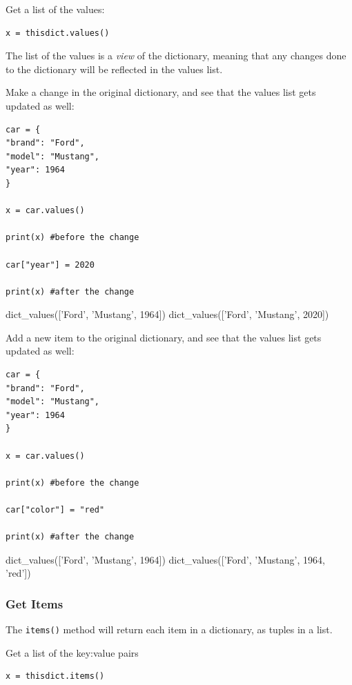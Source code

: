 \documentclass[12pt,a4paper]{article}
\newcommand{\code}[1]{%
	\colorbox{backcolour}{\lstinline{#1}}%
}
\begin{document}
\begin{ebox}
Get a list of the values:
	\begin{lstlisting}
x = thisdict.values()
	\end{lstlisting}
\end{ebox}

The list of the values is a \textit{view} of the dictionary, meaning that any changes
done to the dictionary will be reflected in the values list.

\begin{ebox}
Make a change in the original dictionary, and see that the values list gets updated as well:
	\begin{lstlisting}
car = {
"brand": "Ford",
"model": "Mustang",
"year": 1964
}

x = car.values()

print(x) #before the change

car["year"] = 2020

print(x) #after the change
	\end{lstlisting}
\tcblower
	\begin{vercode}
dict_values(['Ford', 'Mustang', 1964])
dict_values(['Ford', 'Mustang', 2020])
	\end{vercode}
\end{ebox}

\begin{ebox}
Add a new item to the original dictionary, and see that the values list gets updated as well:
	\begin{lstlisting}
car = {
"brand": "Ford",
"model": "Mustang",
"year": 1964
}

x = car.values()

print(x) #before the change

car["color"] = "red"

print(x) #after the change
	\end{lstlisting}
\tcblower
	\begin{vercode}
dict_values(['Ford', 'Mustang', 1964])
dict_values(['Ford', 'Mustang', 1964, 'red'])
	\end{vercode}
\end{ebox}
\subsubsection{Get Items}

The \code{items()} method will return each item in a dictionary, as tuples in a list.

\begin{ebox}
Get a list of the key:value pairs
	\begin{lstlisting}
x = thisdict.items()
	\end{lstlisting}
\end{ebox}
\end{document}
